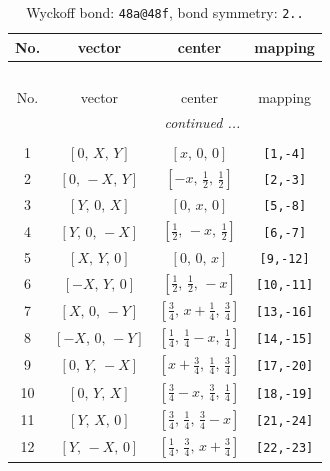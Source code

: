 \documentclass[fleqn,8pt]{jsarticle}
\begin{document}
\begin{longtable}{cccc}
\caption{Wyckoff bond: {\tt 48a@48f}, bond symmetry: {\tt 2..}}
 \\
 \hline \hline
No. & vector & center & mapping \\ \hline \endfirsthead

\multicolumn{3}{l}{\tablename\ \thetable{}} \\
 \hline \hline
No. & vector & center & mapping \\ \hline \endhead

 \hline \hline
\multicolumn{3}{r}{\footnotesize\it continued ...} \\ \endfoot

 \hline \hline
\multicolumn{3}{r}{} \\ \endlastfoot

1 & $\left[ 0,\, X,\, Y \right]$ & $\left[ x,\, 0,\, 0 \right]$ & {\tt [1,-4]} \\ \hline
2 & $\left[ 0,\, - X,\, Y \right]$ & $\left[ - x,\, \frac{1}{2},\, \frac{1}{2} \right]$ & {\tt [2,-3]} \\ \hline
3 & $\left[ Y,\, 0,\, X \right]$ & $\left[ 0,\, x,\, 0 \right]$ & {\tt [5,-8]} \\ \hline
4 & $\left[ Y,\, 0,\, - X \right]$ & $\left[ \frac{1}{2},\, - x,\, \frac{1}{2} \right]$ & {\tt [6,-7]} \\ \hline
5 & $\left[ X,\, Y,\, 0 \right]$ & $\left[ 0,\, 0,\, x \right]$ & {\tt [9,-12]} \\ \hline
6 & $\left[ - X,\, Y,\, 0 \right]$ & $\left[ \frac{1}{2},\, \frac{1}{2},\, - x \right]$ & {\tt [10,-11]} \\ \hline
7 & $\left[ X,\, 0,\, - Y \right]$ & $\left[ \frac{3}{4},\, x + \frac{1}{4},\, \frac{3}{4} \right]$ & {\tt [13,-16]} \\ \hline
8 & $\left[ - X,\, 0,\, - Y \right]$ & $\left[ \frac{1}{4},\, \frac{1}{4} - x,\, \frac{1}{4} \right]$ & {\tt [14,-15]} \\ \hline
9 & $\left[ 0,\, Y,\, - X \right]$ & $\left[ x + \frac{3}{4},\, \frac{1}{4},\, \frac{3}{4} \right]$ & {\tt [17,-20]} \\ \hline
10 & $\left[ 0,\, Y,\, X \right]$ & $\left[ \frac{3}{4} - x,\, \frac{3}{4},\, \frac{1}{4} \right]$ & {\tt [18,-19]} \\ \hline
11 & $\left[ Y,\, X,\, 0 \right]$ & $\left[ \frac{3}{4},\, \frac{1}{4},\, \frac{3}{4} - x \right]$ & {\tt [21,-24]} \\ \hline
12 & $\left[ Y,\, - X,\, 0 \right]$ & $\left[ \frac{1}{4},\, \frac{3}{4},\, x + \frac{3}{4} \right]$ & {\tt [22,-23]} \\
\end{longtable}
\end{document}
